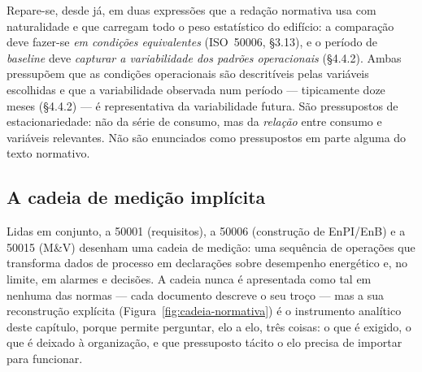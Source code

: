 Repare-se, desde já, em duas expressões que a redação normativa usa com naturalidade e que carregam todo o peso estatístico do edifício: a comparação deve fazer-se \emph{em condições equivalentes} (ISO~50006, \S3.13), e o período de \emph{baseline} deve \emph{capturar a variabilidade dos padrões operacionais} (\S4.4.2). Ambas pressupõem que as condições operacionais são descritíveis pelas variáveis escolhidas e que a variabilidade observada num período --- tipicamente doze meses (\S4.4.2) --- é representativa da variabilidade futura. São pressupostos de estacionariedade: não da série de consumo, mas da \emph{relação} entre consumo e variáveis relevantes. Não são enunciados como pressupostos em parte alguma do texto normativo.

\subsection{A cadeia de medição implícita}
\label{sec:enb-cadeia}

Lidas em conjunto, a 50001 (requisitos), a 50006 (construção de EnPI/EnB) e a 50015 (M\&V) desenham uma cadeia de medição: uma sequência de operações que transforma dados de processo em declarações sobre desempenho energético e, no limite, em alarmes e decisões. A cadeia nunca é apresentada como tal em nenhuma das normas --- cada documento descreve o seu troço --- mas a sua reconstrução explícita (Figura~\ref{fig:cadeia-normativa}) é o instrumento analítico deste capítulo, porque permite perguntar, elo a elo, três coisas: o que é exigido, o que é deixado à organização, e que pressuposto tácito o elo precisa de importar para funcionar.


